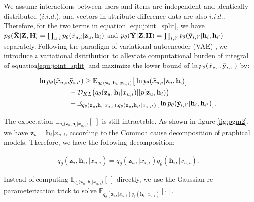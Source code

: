 We assume interactions between users and items are independent and identically distributed ($i.i.d.$), and vectors in attribute difference data are also $i.i.d.$. Therefore, for the two terms in equation \ref{equ:joint_split}, we have $p_{\theta}(\mathbf{\Tilde{X}}|\mathbf{Z,H}) = \prod_{u,i}p_{\theta}(\Tilde{x}_{u,i}|\mathbf{z}_u, \mathbf{h}_i)$ and  $p_{\theta}(\Tilde{\mathbf{Y}}|\mathbf{Z,H}) = \prod_{i,i'}p_{\theta}(\mathbf{\Tilde{y}}_{i,i'}|\mathbf{h}_i, \mathbf{h}_{i'})$ separately. Following the paradigm of variational autoencoder (VAE) \cite{ChenB20PairwiseVAE, mazhou0Y019MacridVAE}, we introduce a variational dsitribution to alleviate computational burden of integral of equation\ref{equ:joint_split} and maximize the lower bound of $\ln p_{\theta}(\Tilde{x}_{u,i}, \mathbf{\Tilde{y}}_{i,i'}) $ by:

\begin{equation}
\begin{aligned}
\ln p_{\theta}(\Tilde{x}_{u,i}, & \mathbf{\Tilde{y}}_{i,i'}) \geq \mathbb{E}_{q_{\theta}{(\mathbf{z}_{u}, \mathbf{h}_{i}|{x}_{u,i}})} \big[\ln p_{\theta}(\Tilde{x}_{u,i} |\mathbf{z}_{u}, \mathbf{h}_{i})\big] \\
& - \mathcal{D}_{KL}\big(q_{\theta}(\mathbf{z}_{u}, \mathbf{h}_{i}|{x}_{u,i}) || p(\mathbf{z}_{u}, \mathbf{h}_{i}) \big) \\
&+ \mathbb{E}_{q_{\theta}{(\mathbf{z}_{u}, \mathbf{h}_{i}|{x}_{u,i}}), q_{\theta}{(\mathbf{z}_{u}, \mathbf{h}_{i'}|{x}_{u,i'}})} \big[\ln p_{\theta}(\mathbf{\Tilde{y}}_{i,i'} |\mathbf{h}_{i}, \mathbf{h}_{i'})\big]. 
\end{aligned}
\label{equ:vae_lb}
\end{equation}

The expectation $\mathbb{E}_{q_{\theta}{(\mathbf{z}_{u}, \mathbf{h}_{i}|x_{u,i}})}[\cdot]$ is still intractable. As shown in figure \ref{fig:pgm2}, we have $\mathbf{z}_{u} \perp \mathbf{h}_{i} | x_{u,i}$, according to the Common cause decomposition of graphical models\cite{Buntine11PGM}. Therefore, we have the following decomposition:

\begin{equation}
\begin{aligned}
q_{\theta}(\mathbf{z}_u,\mathbf{h}_i,|x_{u,i}) = q_{\theta}(\mathbf{z}_u,|x_{u,i}) q_{\theta}(\mathbf{h}_i,|x_{u,i}). \end{aligned}
\label{equ:demopose1}
\end{equation}

Instead of computing $\mathbb{E}_{q_{\theta}{(\mathbf{z}_{u}, \mathbf{h}_{i}|x_{u,i}})}[\cdot]$ directly, we use the Gaussian re-parameterization trick\cite{KingmaW13VAE} to solve $\mathbb{E}_{q_{\theta}(\mathbf{z}_u,|x_{u,i}) q_{\theta}(\mathbf{h}_i,|x_{u,i})}[\cdot]$.


